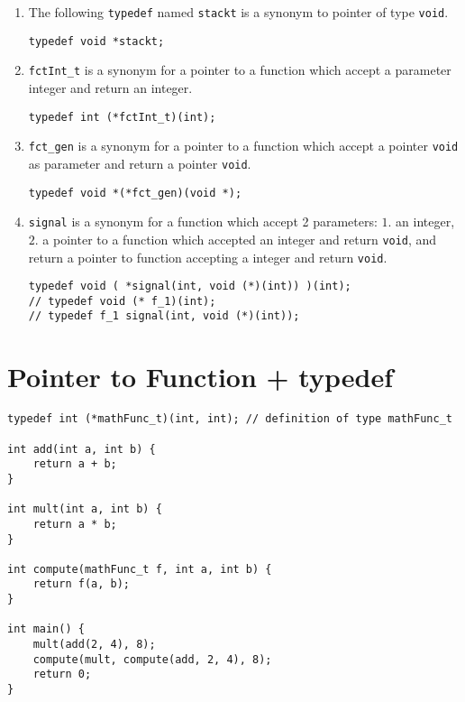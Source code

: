 \begin{enumerate}
    \item The following \verb!typedef! named \verb!stackt! is a synonym to pointer of type \verb!void!.
    \begin{lstlisting}
typedef void *stackt;
    \end{lstlisting}

    \item \verb!fctInt_t! is a synonym for a pointer to a function which accept a parameter integer and return an integer.
    \begin{lstlisting}
typedef int (*fctInt_t)(int);
    \end{lstlisting}

    \item \verb!fct_gen! is a synonym for a pointer to a function which accept a pointer \verb!void! as parameter and return a pointer \verb!void!.
    \begin{lstlisting}
typedef void *(*fct_gen)(void *);
    \end{lstlisting}

    \item \verb!signal! is a synonym for a function which accept 2 parameters: $1.$ an integer, $2.$ a pointer to a function which accepted an integer and return \verb!void!, and return a pointer to function accepting a integer and return \verb!void!.
    \begin{lstlisting}
typedef void ( *signal(int, void (*)(int)) )(int);
// typedef void (* f_1)(int);
// typedef f_1 signal(int, void (*)(int));
    \end{lstlisting}
\end{enumerate}


%
%
\pagebreak
\section{Pointer to Function + typedef}


\begin{lstlisting}
typedef int (*mathFunc_t)(int, int); // definition of type mathFunc_t

int add(int a, int b) {
    return a + b;
}

int mult(int a, int b) {
    return a * b;
}

int compute(mathFunc_t f, int a, int b) {
    return f(a, b);
}

int main() {
    mult(add(2, 4), 8);
    compute(mult, compute(add, 2, 4), 8);
    return 0;
}
\end{lstlisting}


